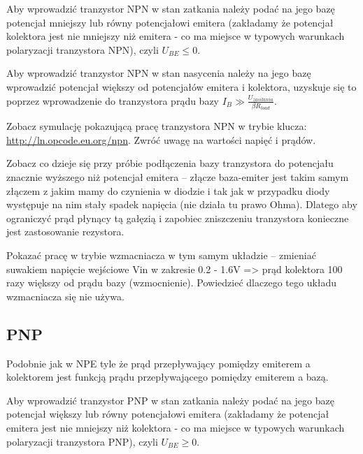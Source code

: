 \documentclass{pdfBooklets}
\begin{document}
Aby wprowadzić tranzystor NPN w stan zatkania należy podać na jego bazę potencjał mniejszy lub równy potencjałowi emitera (zakładamy że potencjał kolektora jest nie mniejszy niż emitera - co ma miejsce w typowych warunkach polaryzacji tranzystora NPN), czyli $U_{BE} \leq 0$.

Aby wprowadzić tranzystor NPN w stan nasycenia należy na jego bazę wprowadzić potencjał większy od potencjałów emitera i kolektora, uzyskuje się to poprzez wprowadzenie do tranzystora prądu bazy $I_B \gg \frac{U_{zasilania}}{\beta R_{load}}$.

Zobacz symulację pokazującą pracę tranzystora NPN w trybie klucza: \url{http://ln.opcode.eu.org/npn}.
Zwróć uwagę na wartości napięć i prądów.

Zobacz co dzieje się przy próbie podłączenia bazy tranzystora do potencjału znacznie wyższego niż potencjał emitera – złącze baza-emiter jest takim samym złączem z jakim mamy do czynienia w diodzie i tak jak w przypadku diody występuje na nim stały spadek napięcia (nie działa tu prawo Ohma). Dlatego aby ograniczyć prąd płynący tą gałęzią i zapobiec zniszczeniu tranzystora konieczne jest zastosowanie rezystora.

\begin{teacherOnly}
Pokazać pracę w trybie wzmacniacza w tym samym układzie – zmieniać suwakiem napięcie wejściowe Vin w zakresie 0.2 - 1.6V => prąd kolektora 100 razy większy od prądu bazy (wzmocnienie).
Powiedzieć dlaczego tego układu wzmacniacza się nie używa.
\end{teacherOnly}

\subsection{PNP}
Podobnie jak w NPE tyle że prąd przepływający pomiędzy emiterem a kolektorem jest funkcją prądu przepływającego pomiędzy emiterem a bazą.

Aby wprowadzić tranzystor PNP w stan zatkania należy podać na jego bazę potencjał większy lub równy potencjałowi emitera (zakładamy że potencjał emitera jest nie mniejszy niż kolektora - co ma miejsce w typowych warunkach polaryzacji tranzystora PNP), czyli $U_{BE} \geq 0$.
\end{document}
